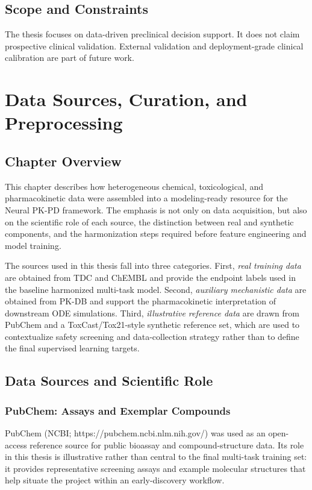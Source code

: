 \documentclass[a4paper,11pt,twoside]{report}
\begin{document}
\section{Scope and Constraints}

The thesis focuses on data-driven preclinical decision support. It does not claim prospective clinical validation. External validation and deployment-grade clinical calibration are part of future work.

\chapter{Data Sources, Curation, and Preprocessing}

\section{Chapter Overview}

This chapter describes how heterogeneous chemical, toxicological, and pharmacokinetic data were assembled into a modeling-ready resource for the Neural PK-PD framework. The emphasis is not only on data acquisition, but also on the scientific role of each source, the distinction between real and synthetic components, and the harmonization steps required before feature engineering and model training.

The sources used in this thesis fall into three categories. First, \textit{real training data} are obtained from TDC and ChEMBL and provide the endpoint labels used in the baseline harmonized multi-task model. Second, \textit{auxiliary mechanistic data} are obtained from PK-DB and support the pharmacokinetic interpretation of downstream ODE simulations. Third, \textit{illustrative reference data} are drawn from PubChem and a ToxCast/Tox21-style synthetic reference set, which are used to contextualize safety screening and data-collection strategy rather than to define the final supervised learning targets.

\section{Data Sources and Scientific Role}

\subsection{PubChem: Assays and Exemplar Compounds}

PubChem (NCBI; https://pubchem.ncbi.nlm.nih.gov/) was used as an open-access reference source for public bioassay and compound-structure data. Its role in this thesis is illustrative rather than central to the final multi-task training set: it provides representative screening assays and example molecular structures that help situate the project within an early-discovery workflow.
\end{document}
